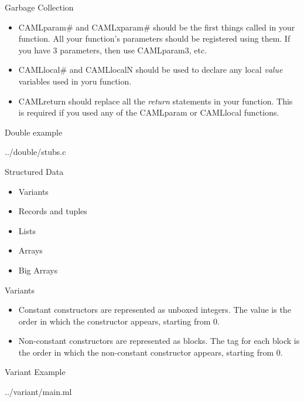 \documentclass{beamer}
\begin{document}
\begin{frame}{Garbage Collection}
\begin{itemize}
    \item CAMLparam\# and CAMLxparam\# should be the first things called in your function.  All your function's
    parameters should be registered using them.  If you have 3 parameters, then use CAMLparam3, etc.
    \item CAMLlocal\# and CAMLlocalN should be used to declare any local \emph{value} variables used in yoru function.
    \item CAMLreturn should replace all the \emph{return} statements in your function.  This is required if you used
    any of the CAMLparam or CAMLlocal functions.
\end{itemize}
\end{frame}

\begin{frame}[fragile]{Double example}
\begin{lstinputlisting}[language=C]{../double/stubs.c}
\end{lstinputlisting}
\end{frame}

\begin{frame}{Structured Data}
\begin{itemize}
    \item Variants
    \item Records and tuples
    \item Lists
    \item Arrays
    \item Big Arrays
\end{itemize}
\end{frame}

\begin{frame}{Variants}
\begin{itemize}
    \item Constant constructors are represented as unboxed integers.  The value is the order in which the constructor
    appears, starting from 0.
    \item Non-constant constructors are represented as blocks.  The tag for each block is the order in which the
    non-constant constructor appears, starting from 0.
\end{itemize}
\end{frame}

\begin{frame}[fragile,shrink=10]{Variant Example}
\begin{lstinputlisting}[language=ML]{../variant/main.ml}
\end{lstinputlisting}
\end{frame}
\end{document}
